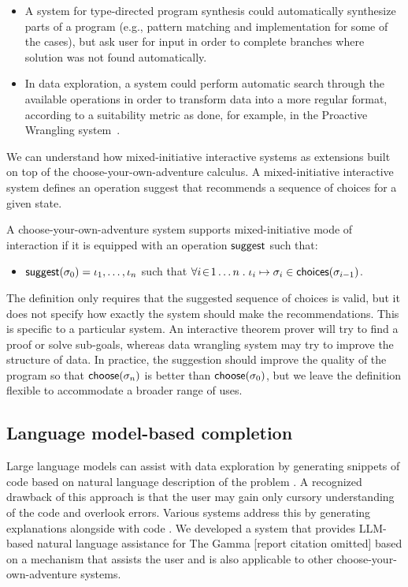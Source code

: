 \documentclass[ a4paper,UKenglish,cleveref, autoref, thm-restate]{lipics-v2021}
\newcommand{\ident}[1]{\textsf{#1}}
\newcommand{\select}{\textnormal{\ident{choose}}}
\newcommand{\suggest}{\textnormal{\ident{suggest}}}
\newcommand{\choices}{\textnormal{\ident{choices}}}
\begin{document}
\begin{itemize}
\setlength{\itemsep}{5pt}
\item A system for type-directed program synthesis could automatically synthesize parts of a
  program (e.g., pattern matching and implementation for some of the cases), but ask user for
  input in order to complete branches where solution was not found automatically.
\item In data exploration, a system could perform automatic search through the available operations
  in order to transform data into a more regular format, according to a suitability
  metric as done, for example, in the Proactive Wrangling system~\cite{guo-2011-proactive}.
\end{itemize}

We can understand how mixed-initiative interactive systems as extensions
built on top of the choose-your-own-adventure calculus. A mixed-initiative interactive system
defines an operation \ident{suggest} that recommends a sequence of choices for a given state.

\begin{definition}
A choose-your-own-adventure system supports mixed-initiative mode of interaction if it is
equipped with an operation $\suggest$ such that:
\begin{itemize}
  \item $\suggest(\sigma_0)=\iota_1, \ldots, \iota_n$ such that
    $\forall i\!\in\! 1\ldots n\;.\;\iota_i\mapsto\sigma_i\in\choices(\sigma_{i-1})$.
\end{itemize}
\end{definition}

The definition only requires that the suggested sequence of choices is valid, but it
does not specify how exactly the system should make the recommendations. This is specific to
a particular system. An interactive theorem prover will try to find a proof or solve
sub-goals, whereas data wrangling system may try to improve the structure of data.
In practice, the suggestion should improve the quality of the program so that
$\select(\sigma_n)$ is better than $\select(\sigma_0)$, but we leave the definition flexible
to accommodate a broader range of uses.

\subsection{Language model-based completion}
Large language models can assist with data exploration by generating snippets of code based
on natural language description of the problem \cite{yin-2023-codegen}. A recognized drawback of
this approach is that the user may gain only cursory understanding of the code and overlook
errors. Various systems address this by generating explanations alongside with code \cite{nooralahzadeh-2024-data}.
We developed a system that provides LLM-based natural language assistance for The Gamma [report
citation omitted] based on a mechanism that assists the user and is also applicable to other
choose-your-own-adventure systems.
\end{document}
